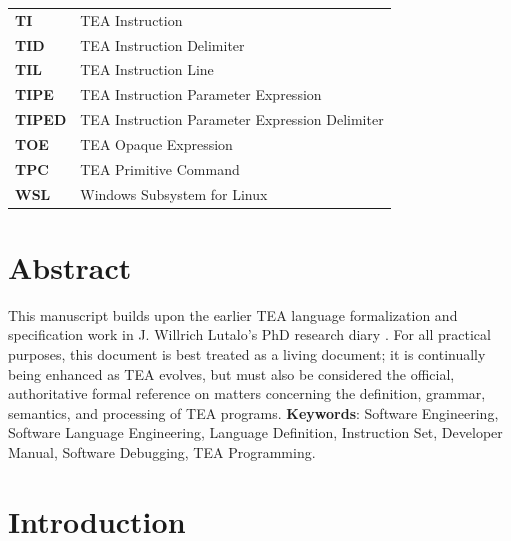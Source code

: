 \documentclass[a4paper, 18pt]{book} %
\begin{document}
\begin{longtable}{p{3cm} p{12cm}}
\textbf{TI} & TEA Instruction\\
 
\textbf{TID} & TEA Instruction Delimiter\\
 
\textbf{TIL} & TEA Instruction Line\\

\textbf{TIPE} & TEA Instruction Parameter Expression\\

\textbf{TIPED} & TEA Instruction Parameter Expression Delimiter\\

\textbf{TOE} & TEA Opaque Expression\\

\textbf{TPC} & TEA Primitive Command\\

\textbf{WSL} & Windows Subsystem for Linux\\




\end{longtable}





\mainmatter

\chapter*{Abstract}
\large

This manuscript builds upon the earlier TEA language formalization and specification work in J. Willrich Lutalo's PhD research diary \cite{lutalo2024tea}. For all practical purposes, this document is best treated as a living document; it is continually being enhanced as TEA evolves, but must also be considered the official, authoritative formal reference on matters concerning the definition, grammar, semantics, and processing of TEA programs. 
     \newline\newline
     \textbf{Keywords}: Software Engineering, Software Language Engineering, Language Definition, Instruction Set, Developer Manual, Software Debugging, TEA Programming.

\newpage

\chapter{Introduction}
\label{SEC1}
\end{document}
